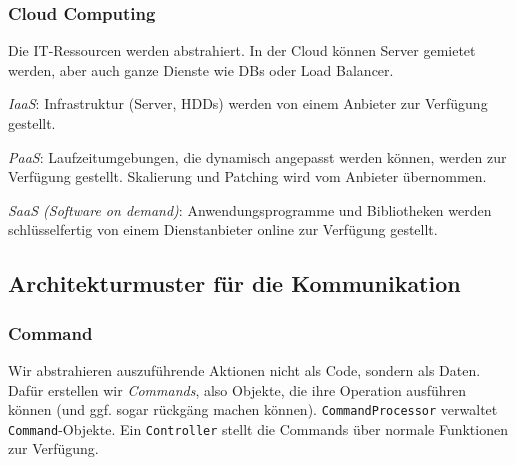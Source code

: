 \documentclass{panikzettel}
\begin{document}
\subsubsection{Cloud Computing}
Die IT-Ressourcen werden abstrahiert.
In der Cloud können Server gemietet werden, aber auch ganze Dienste wie DBs oder Load Balancer.

\emph{IaaS}: Infrastruktur (Server, HDDs) werden von einem Anbieter zur Verfügung gestellt.

\emph{PaaS}: Laufzeitumgebungen, die dynamisch angepasst werden können, werden zur Verfügung gestellt.
Skalierung und Patching wird vom Anbieter übernommen.

\emph{SaaS (Software on demand)}: Anwendungsprogramme und Bibliotheken werden
schlüsselfertig von einem Dienstanbieter online zur Verfügung gestellt.

\subsection{Architekturmuster für die Kommunikation}

\subsubsection{Command}

Wir abstrahieren auszuführende Aktionen nicht als Code, sondern als Daten.
Dafür erstellen wir \emph{Commands}, also Objekte, die ihre Operation ausführen können (und ggf. sogar rückgäng machen können).
\lstinline{CommandProcessor} verwaltet \lstinline{Command}-Objekte.
Ein \lstinline{Controller} stellt die Commands über normale Funktionen zur Verfügung.

\end{document}
